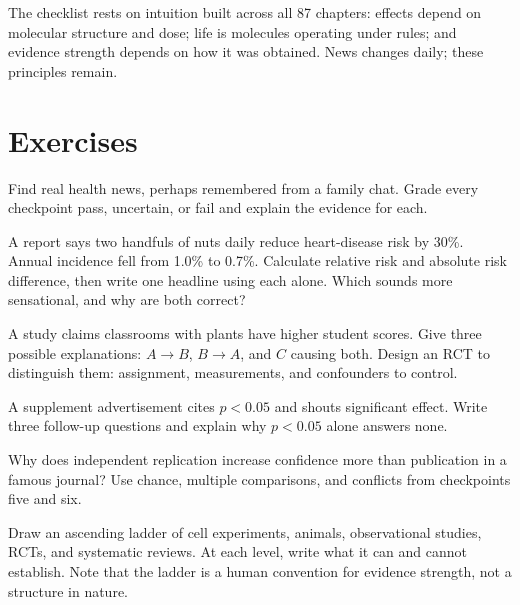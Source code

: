 The checklist rests on intuition built across all 87 chapters: effects depend on molecular structure and dose; life is molecules operating under rules; and evidence strength depends on how it was obtained. News changes daily; these principles remain.

\section*{Exercises}

\begin{sikaoti}
\item Find real health news, perhaps remembered from a family chat. Grade every checkpoint pass, uncertain, or fail and explain the evidence for each.
\item A report says two handfuls of nuts daily reduce heart-disease risk by 30\%. Annual incidence fell from 1.0\% to 0.7\%. Calculate relative risk and absolute risk difference, then write one headline using each alone. Which sounds more sensational, and why are both correct?
\item A study claims classrooms with plants have higher student scores. Give three possible explanations: $A\rightarrow B$, $B\rightarrow A$, and $C$ causing both. Design an RCT to distinguish them: assignment, measurements, and confounders to control.
\item A supplement advertisement cites $p<0.05$ and shouts significant effect. Write three follow-up questions and explain why $p<0.05$ alone answers none.
\item Why does independent replication increase confidence more than publication in a famous journal? Use chance, multiple comparisons, and conflicts from checkpoints five and six.
\item Draw an ascending ladder of cell experiments, animals, observational studies, RCTs, and systematic reviews. At each level, write what it can and cannot establish. Note that the ladder is a human convention for evidence strength, not a structure in nature.
\end{sikaoti}
